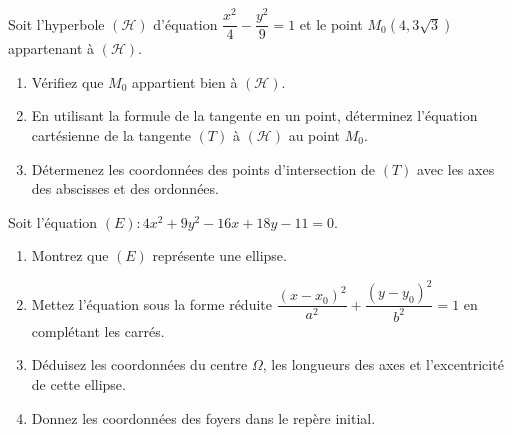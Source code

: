 \documentclass[11pt]{article}
\begin{document}
\begin{exercice}
Soit l'hyperbole $(\mathcal{H})$ d'équation $\dfrac{x^2}{4} - \dfrac{y^2}{9} = 1$ et le point $M_0(4, 3\sqrt{3})$ appartenant à $(\mathcal{H})$.
\begin{enumerate}
    \item Vérifiez que $M_0$ appartient bien à $(\mathcal{H})$.
    \item En utilisant la formule de la tangente en un point, déterminez l'équation cartésienne de la tangente $(T)$ à $(\mathcal{H})$ au point $M_0$.
    \item Détermenez les coordonnées des points d'intersection de $(T)$ avec les axes des abscisses et des ordonnées.
\end{enumerate}
\end{exercice}

\begin{exercice}
Soit l'équation $(E) : 4x^2 + 9y^2 - 16x + 18y - 11 = 0$.
\begin{enumerate}
    \item Montrez que $(E)$ représente une ellipse.
    \item Mettez l'équation sous la forme réduite $\dfrac{(x - x_0)^2}{a^2} + \dfrac{(y - y_0)^2}{b^2} = 1$ en complétant les carrés.
    \item Déduisez les coordonnées du centre $\Omega$, les longueurs des axes et l'excentricité de cette ellipse.
    \item Donnez les coordonnées des foyers dans le repère initial.
\end{enumerate}
\end{exercice}
\end{document}
